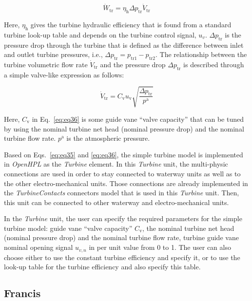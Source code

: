 \documentclass[%
]{USN-PhD}
\begin{document}
\begin{equation}\label{eq:eq35}
\dot{W}_\mathrm{tr} = \eta_\mathrm{h}\Delta p_\mathrm{tr}\dot{V}_\mathrm{tr}
\end{equation}

Here, $\eta_\mathrm{h}$ gives the turbine hydraulic efficiency that is found from a standard turbine look-up table and depends on the turbine control signal, $u_v$. $\Delta p_\mathrm{tr}$ is the pressure drop through the turbine that is defined as the difference between inlet and outlet turbine pressures, i.e., $\Delta p_\mathrm{tr} = p_\mathrm{tr1}-p_\mathrm{tr2}$. The relationship between the turbine volumetric flow rate $\dot{V}_\mathrm{tr}$ and the pressure drop $\Delta p_\mathrm{tr}$ is described through a simple valve-like expression as follows:

\begin{equation}\label{eq:eq36}
\dot{V}_\mathrm{tr} = C_\mathrm{v} u_\mathrm{v} \sqrt{\frac{\Delta p_\mathrm{tr}}{p^\mathrm{a}}}
\end{equation}

Here, $C_\mathrm{v}$ in Eq.~\ref{eq:eq36} is some guide vane ``valve capacity'' that can be tuned by using the nominal turbine net head (nominal pressure drop) and the nominal turbine flow rate. $p^\mathrm{a}$ is the atmospheric pressure.

Based on Eqs.~\ref{eq:eq35} and \ref{eq:eq36}, the simple turbine model is implemented in \emph{OpenHPL} as the \emph{Turbine} element.  In this \emph{Turbine} unit, the multi-physic connections are used in order to stay connected to waterway units as well as to the other electro-mechanical units. Those connections are already implemented in the \emph{TurbineContacts} connectors model that is used in this \emph{Turbine} unit. Then, this unit can be connected to other waterway and electro-mechanical units.

In the \emph{Turbine} unit, the user can specify the required parameters for the simple turbine model:  guide vane ``valve capacity'' $C_\mathrm{v}$, the nominal turbine net head (nominal pressure drop) and the nominal turbine flow rate, turbine guide vane nominal opening signal  $u_{v,n}$ in per unit value from 0 to 1. The user can also choose either to use the constant turbine efficiency and specify it, or to use the look-up table for the turbine efficiency and also specify this table.

\subsection{Francis}
\end{document}
